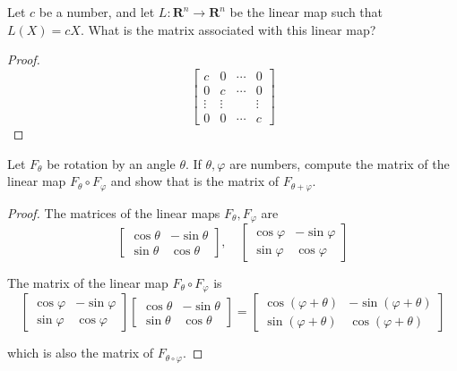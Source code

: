 \begin{exercise}
    Let $c$ be a number, and let $L: \mathbf{R}^{n} \to \mathbf{R}^{n}$ be the linear map such that $L(X) = cX$. What is the matrix associated with this linear map?
\end{exercise}

\begin{proof}
    \[
        \begin{bmatrix}
            c      & 0      & \cdots & 0      \\
            0      & c      & \cdots & 0      \\
            \vdots & \vdots &        & \vdots \\
            0      & 0      & \cdots & c
        \end{bmatrix}
    \]
\end{proof}

\begin{exercise}
    Let $F_{\theta}$ be rotation by an angle $\theta$. If $\theta, \varphi$ are numbers, compute the matrix of the linear map $F_{\theta}\circ F_{\varphi}$ and show that is the matrix of $F_{\theta + \varphi}$.
\end{exercise}

\begin{proof}
    The matrices of the linear maps $F_{\theta}, F_{\varphi}$ are
    \[
        \begin{bmatrix}
            \cos\theta & -\sin\theta \\
            \sin\theta & \cos\theta
        \end{bmatrix},\quad
        \begin{bmatrix}
            \cos\varphi & -\sin\varphi \\
            \sin\varphi & \cos\varphi
        \end{bmatrix}
    \]

    The matrix of the linear map $F_{\theta}\circ F_{\varphi}$ is
    \[
        \begin{bmatrix}
            \cos\varphi & -\sin\varphi \\
            \sin\varphi & \cos\varphi
        \end{bmatrix}
        \begin{bmatrix}
            \cos\theta & -\sin\theta \\
            \sin\theta & \cos\theta
        \end{bmatrix}
        =
        \begin{bmatrix}
            \cos(\varphi + \theta) & -\sin(\varphi + \theta) \\
            \sin(\varphi + \theta) & \cos(\varphi + \theta)
        \end{bmatrix}
    \]

    which is also the matrix of $F_{\theta\circ\varphi}$.
\end{proof}

